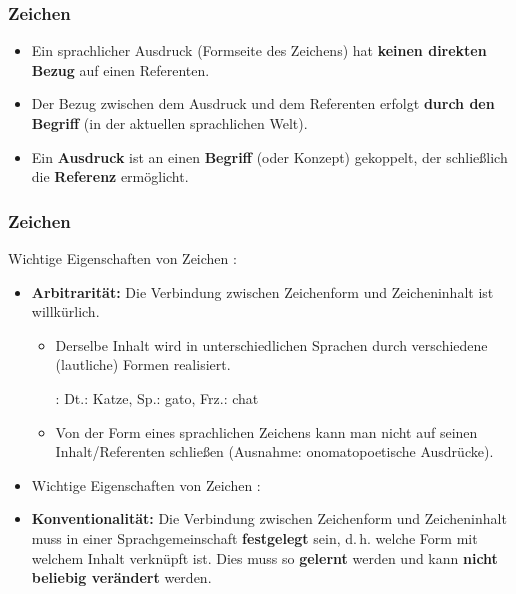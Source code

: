 \begin{frame}
	
\end{frame}	



\begin{frame}
\frametitle{Zeichen}

\begin{itemize}
	\item Ein sprachlicher Ausdruck (Formseite des Zeichens) hat \textbf{keinen direkten Bezug} auf einen Referenten.
	
	\medskip	
	
	\item Der Bezug zwischen dem Ausdruck und dem Referenten erfolgt \textbf{durch den Begriff} (in der aktuellen sprachlichen Welt).
	
	\medskip
	
	\item Ein \textbf{Ausdruck} ist an einen \textbf{Begriff} (oder Konzept) gekoppelt, der schließlich die \textbf{Referenz} ermöglicht.
		
\end{itemize}
	
\end{frame}


\begin{frame}
\frametitle{Zeichen}

Wichtige Eigenschaften von Zeichen \citep[vgl.][]{Saussure16x}:

\begin{itemize}
			
	\item \textbf{Arbitrarität:} Die Verbindung zwischen Zeichenform und Zeicheninhalt ist willkürlich.
	
	\begin{itemize}
		\item Derselbe Inhalt wird in unterschiedlichen Sprachen durch verschiedene (lautliche) Formen realisiert.
		
		\ea {}: Dt.: Katze, Sp.: gato, Frz.: chat
		\z 
		
		\item Von der Form eines sprachlichen Zeichens kann man nicht auf seinen Inhalt/Referenten schließen (Ausnahme: onomatopoetische Ausdrücke).
	\end{itemize}	
		
		\pause
		
		\item Wichtige Eigenschaften von Zeichen \citep[vgl.][]{Saussure16x}:
		
		\medskip
		
		\item \textbf{Konventionalität:} Die Verbindung zwischen Zeichenform und Zeicheninhalt muss in einer Sprachgemeinschaft \textbf{festgelegt} sein, d.\,h. welche Form mit welchem Inhalt verknüpft ist. Dies muss so \textbf{gelernt} werden und kann \textbf{nicht beliebig verändert} werden.	
		
\end{itemize}

\end{frame}



